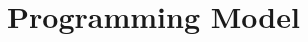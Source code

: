 \documentclass[runningheads]{llncs}
\newcounter{ojcount}
\newcommand{\oj}[1]{\stepcounter{ojcount}\textcolor{green!60!black}{\textsf{OJ \theojcount: #1}\newline}}
\newcommand{\ahoy}{Ahoy\xspace}
\begin{document}








\section{Programming Model}
\end{document}

